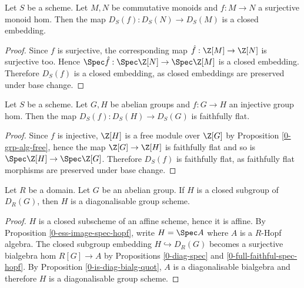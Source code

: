 \begin{proposition}
  \label{0-diag-closed-emb}

  Let $S$ be a scheme.
  Let $M, N$ be commutative monoids and $f : M \to N$ a surjective monoid hom.
  Then the map $D_S(f) : D_S(N) \to D_S(M)$ is a closed embedding.
\end{proposition}
\begin{proof}

  Since $f$ is surjective, the corresponding map $\hat f : \Z[M] \to \Z[N]$ is surjective too.
  Hence $\Spec \hat f : \Spec \Z[N] \to \Spec \Z[M]$ is a closed embedding.
  Therefore $D_S(f)$ is a closed embedding, as closed embeddings are preserved under base change.
\end{proof}


\begin{proposition}
  \label{0-diag-faithful-flat}

  Let $S$ be a scheme.
  Let $G, H$ be abelian groups and $f : G \to H$ an injective group hom.
  Then the map $D_S(f) : D_S(H) \to D_S(G)$ is faithfully flat.
\end{proposition}
\begin{proof}

  Since $f$ is injective, $\Z[H]$ is a free module over $\Z[G]$ by Proposition \ref{0-grp-alg-free},
  hence the map $\Z[G] \to \Z[H]$ is faithfully flat and so is $\Spec \Z[H] \to \Spec \Z[G]$.
  Therefore $D_S(f)$ is faithfully flat,
  as faithfully flat morphisms are preserved under base change.
\end{proof}


\begin{proposition}
  \label{0-subgroup-diag}

  Let $R$ be a domain. Let $G$ be an abelian group.
  If $H$ is a closed subgroup of $D_R(G)$, then $H$ is a diagonalisable group scheme.
\end{proposition}
\begin{proof}

  $H$ is a closed subscheme of an affine scheme, hence it is affine.
  By Proposition \ref{0-ess-image-spec-hopf}, write $H = \Spec A$ where $A$ is a $R$-Hopf algebra.
  The closed subgroup embedding $H \hookrightarrow D_R(G)$
  becomes a surjective bialgebra hom $R[G] \to A$ by
  Propositions \ref{0-diag-spec} and \ref{0-full-faithful-spec-hopf}.
  By Proposition \ref{0-is-diag-bialg-quot},
  $A$ is a diagonalisable bialgebra and therefore $H$ is a diagonalisable group scheme.
\end{proof}


